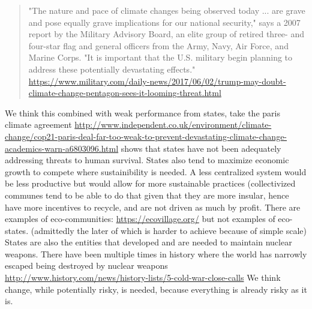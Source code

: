 \documentclass[11pt]{article}
\begin{document}
\begin{quote}
"The nature and pace of climate changes being observed today ... are grave and pose equally grave implications for our national security," says a 2007 report by the Military Advisory Board, an elite group of retired three- and four-star flag and general officers from the Army, Navy, Air Force, and Marine Corps. "It is important that the U.S. military begin planning to address these potentially devastating effects." \url{https://www.military.com/daily-news/2017/06/02/trump-may-doubt-climate-change-pentagon-sees-it-looming-threat.html}
\end{quote}
We think this combined with weak performance from states, take the paris climate agreement \url{http://www.independent.co.uk/environment/climate-change/cop21-paris-deal-far-too-weak-to-prevent-devastating-climate-change-academics-warn-a6803096.html} shows that states have not been adequately addressing threats to human survival. States also tend to maximize economic growth to compete where sustainibility is needed. A less centralized system would be less productive but would allow for more sustainable practices (collectivized communes tend to be able to do that given that they are more insular, hence have more incentives to recycle, and are not driven as much by profit. There are examples of eco-communities: \url{https://ecovillage.org/} but not examples of eco-states. (admittedly the later of which is harder to achieve because of simple scale) States are also the entities that developed and are needed to maintain nuclear weapons. There have been multiple times in history where the world has narrowly escaped being destroyed by nuclear weapons \url{http://www.history.com/news/history-lists/5-cold-war-close-calls} We think change, while potentially risky, is needed, because everything is already risky as it is.
\medskip
\end{document}
